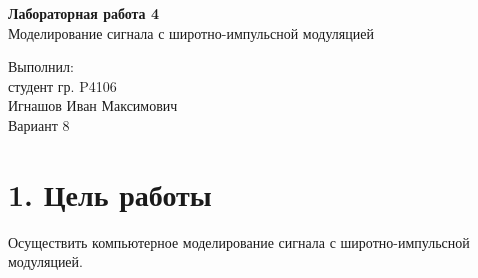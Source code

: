 \documentclass[12pt]{article}
\begin{document}



\begin{center}
	\LARGE 
	\textbf{Лабораторная работа 4}\\
	Моделирование сигнала с широтно-импульсной модуляцией
	\\[3\baselineskip]
\end{center}

\begin{flushright}
	\large
	Выполнил:\\
	студент гр. P4106\\
	Игнашов Иван Максимович\\
	Вариант 8\\
\end{flushright}

\newpage

 \section*{1. Цель работы}
Осуществить компьютерное моделирование сигнала с широтно-импульсной модуляцией.
\end{document}
